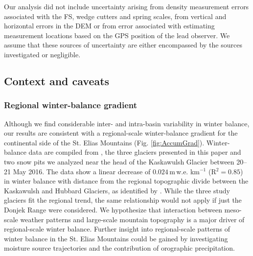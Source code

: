 \documentclass[twocolumn, letterpaper]{igs}
\begin{document}
Our analysis did not include uncertainty arising from density measurement errors associated with the FS, wedge cutters and spring scales, from vertical and horizontal errors in the DEM or from error associated with estimating measurement locations based on the GPS position of the lead observer. We assume that these sources of uncertainty are either encompassed by the sources investigated or negligible.


\subsection{Context and caveats}
\subsubsection{Regional winter-balance gradient}

Although we find considerable inter- and intra-basin variability in winter balance, our results are consistent with a regional-scale winter-balance gradient for the continental side of the St. Elias Mountains (Fig. \ref{fig:AccumGrad}). Winter-balance data are compiled from \cite{Taylor1969}, the three glaciers presented in this paper and two snow pits we analyzed near the head of the Kaskawulsh Glacier between 20--21 May 2016. The data show a linear decrease of $0.024$\,m\,w.e. km$^{-1}$ (R$^2=0.85$) in winter balance with distance from the regional topographic divide between the Kaskawulsh and Hubbard Glaciers, as identified by \cite{Taylor1969}. While the three study glaciers fit the regional trend, the same relationship would not apply if just the Donjek Range were considered. We hypothesize that interaction between meso-scale weather patterns and large-scale mountain topography is a major driver of regional-scale winter balance. Further insight into regional-scale patterns of winter balance in the St. Elias Mountains could be gained by investigating moisture source trajectories and the contribution of orographic precipitation. 
\end{document}
